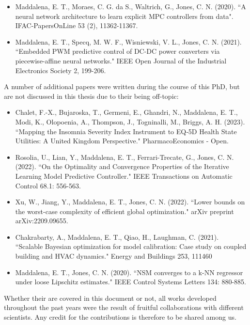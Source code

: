 \begin{itemize}
	\item Maddalena, E. T., Moraes, C. G. da S., Waltrich, G., Jones, C. N. (2020). ``A neural network architecture to learn explicit MPC controllers from data". IFAC-PapersOnLine 53 (2), 11362-11367. 
	
	\item Maddalena, E. T., Specq, M. W. F., Wisniewski, V. L., Jones, C. N. (2021). ``Embedded PWM predictive control of DC-DC power converters via piecewise-affine neural networks." IEEE Open Journal of the Industrial Electronics Society 2, 199-206.
\end{itemize}


A number of additional papers were written during the course of this PhD, but are not discussed in this thesis due to their being off-topic:

\begin{itemize}	
	\item Chalet, F.-X., Bujaroska,  T., Germeni, E., Ghandri, N., Maddalena, E. T., Modi, K., Olopoenia, A., Thompson, J., Togninalli, M., Briggs, A. H. (2023). ``Mapping the Insomnia Severity Index Instrument to EQ‑5D Health State Utilities: A United Kingdom Perspective." PharmacoEconomics - Open.
	
	\item Rosolia, U., Lian, Y., Maddalena, E. T., Ferrari-Trecate, G., Jones, C. N. (2022). ``On the Optimality and Convergence Properties of the Iterative Learning Model Predictive Controller." IEEE Transactions on Automatic Control 68.1: 556-563.	
	
	\item Xu, W., Jiang, Y., Maddalena, E. T., Jones, C. N. (2022). ``Lower bounds on the worst-case complexity of efficient global optimization." arXiv preprint arXiv:2209.09655.
		
	\item Chakrabarty, A., Maddalena, E. T., Qiao, H., Laughman, C. (2021). ``Scalable Bayesian optimization for model calibration: Case study on coupled building and HVAC dynamics." Energy and Buildings 253, 111460
	
	\item Maddalena, E. T., Jones, C. N. (2020). ``NSM converges to a k-NN regressor under loose Lipschitz estimates." IEEE Control Systems Letters  134: 880-885.
\end{itemize}

Whether their are covered in this document or not, all works developed throughout the past years were the result of fruitful collaborations with different scientists. Any credit for the contributions is therefore to be shared among us.